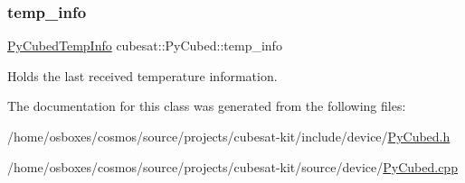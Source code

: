 \mbox{\label{classcubesat_1_1PyCubed_a5508151b5f50200754c0a10efcc0445c}} 
\subsubsection{\texorpdfstring{temp\+\_\+info}{temp\_info}}
{\footnotesize\ttfamily \hyperlink{structcubesat_1_1PyCubedTempInfo}{Py\+Cubed\+Temp\+Info} cubesat\+::\+Py\+Cubed\+::temp\+\_\+info\hspace{0.3cm}{\ttfamily [private]}}



Holds the last received temperature information. 



The documentation for this class was generated from the following files\+:\begin{DoxyCompactItemize}
\item 
/home/osboxes/cosmos/source/projects/cubesat-\/kit/include/device/\hyperlink{PyCubed_8h}{Py\+Cubed.\+h}\item 
/home/osboxes/cosmos/source/projects/cubesat-\/kit/source/device/\hyperlink{PyCubed_8cpp}{Py\+Cubed.\+cpp}\end{DoxyCompactItemize}
